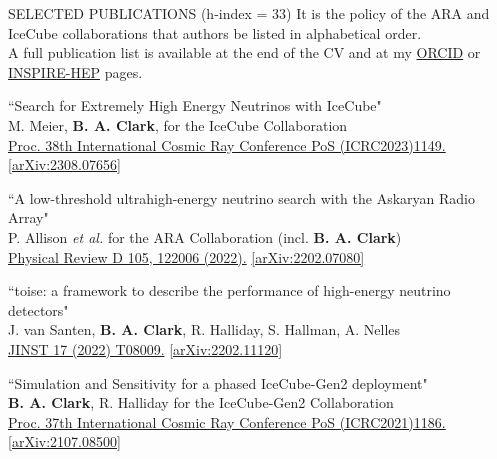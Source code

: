 \documentclass{resume} %
\begin{document}
\newpage
\begin{rSection}{SELECTED PUBLICATIONS (h-index = 33)}
  It is the policy of the ARA and IceCube collaborations that authors be listed in alphabetical order. \\  A full publication list is available at the end of the CV and at my \href{https://orcid.org/0000-0003-4089-2245}{ORCID}  or  \href{https://inspirehep.net/author/profile/Brian.A.Clark.1}{INSPIRE-HEP} pages.

\begin{etaremune}%

  \item ``Search for Extremely High Energy Neutrinos with IceCube" \\
 M. Meier, \textbf{B. A. Clark}, for the IceCube Collaboration \\ \href{https://doi.org/10.22323/1.444.1149}{Proc. 38th International Cosmic Ray Conference PoS (ICRC2023)1149.}  \href{https://arxiv.org/abs/2308.07656}{[arXiv:2308.07656]}

  \item ``A low-threshold ultrahigh-energy neutrino search with the Askaryan Radio Array" \\
 P. Allison {\it et al.} for the ARA Collaboration (incl. \textbf{B. A. Clark})\\ \href{https://doi.org/10.1103/PhysRevD.105.122006}{Physical Review D 105, 122006 (2022).}  \href{https://arxiv.org/abs/2202.07080}{[arXiv:2202.07080]}


  \item ``toise: a framework to describe the performance of high-energy neutrino detectors" \\
 J. van Santen, \textbf{B. A. Clark}, R. Halliday, S. Hallman, A. Nelles \\  \href{https://doi.org/10.1088/1748-0221/17/08/T08009}{JINST 17 (2022) T08009.}  \href{https://arxiv.org/abs/2202.11120}{[arXiv:2202.11120]}


  \item ``Simulation and Sensitivity for a phased IceCube-Gen2 deployment" \\
 \textbf{B. A. Clark}, R. Halliday for the IceCube-Gen2 Collaboration \\ \href{https://doi.org/10.22323/1.395.1186}{Proc. 37th International Cosmic Ray Conference PoS (ICRC2021)1186.}  \href{https://arxiv.org/abs/2107.08500}{[arXiv:2107.08500]}
 

\end{etaremune}
\end{rSection}
\end{document}

